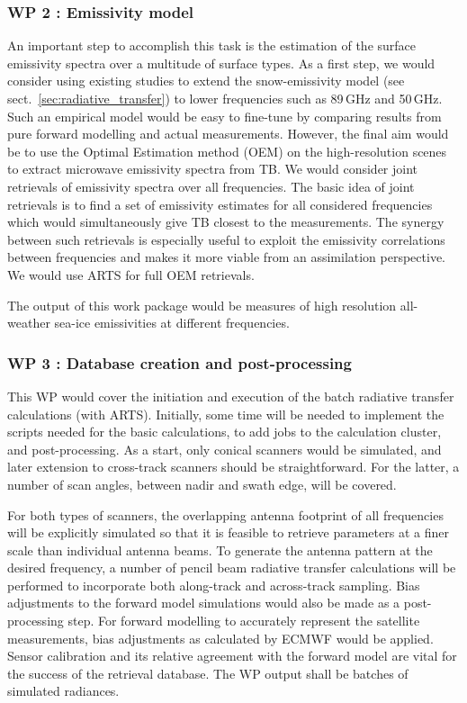 \documentclass[12pt,oneside,a4paper]{article}
\begin{document}
\subsubsection*{WP 2 : Emissivity model}
%
\label{sec:emissivity}
An important step to accomplish this task is the estimation of the surface emissivity spectra over a multitude of surface types. As a first step, we would consider using existing studies to extend the snow-emissivity model (see sect.~\ref{sec:radiative_transfer}) to lower frequencies such as 89\,GHz and 50\,GHz. Such an empirical model would be easy to fine-tune by comparing results from pure forward modelling and actual measurements. However, the final aim would be to use the Optimal Estimation method (OEM) on the high-resolution scenes to extract microwave emissivity spectra from TB. We would consider joint retrievals of emissivity spectra over all frequencies. The basic idea of joint retrievals is to find a set of emissivity estimates for all considered frequencies which would simultaneously give TB closest to the measurements. The synergy between such retrievals is especially useful to exploit the emissivity correlations between frequencies and makes it more viable from an assimilation perspective. We would use ARTS for full OEM retrievals.

The output of this work package would be measures of high resolution all-weather sea-ice emissivities at different frequencies. 
	
\subsubsection*{WP 3 : Database creation and post-processing}
%
\label{sec:database}	
This WP would cover the initiation and execution of the batch radiative transfer calculations (with ARTS). Initially, some time will be needed to implement the scripts needed for the basic calculations, to add jobs to the calculation cluster, and post-processing. As a start, only conical scanners would be simulated, and later extension to cross-track scanners should be straightforward. For the latter, a number of scan angles, between nadir and swath edge, will be covered.

For both types of scanners, the overlapping antenna footprint of all frequencies will be explicitly simulated so that it is feasible to retrieve parameters at a finer scale than individual antenna beams. To generate the antenna pattern at the desired frequency, a number of pencil beam radiative transfer calculations will be performed to incorporate both along-track and across-track sampling. Bias adjustments to the forward model simulations would also be made as a post-processing step. For forward modelling to accurately represent the satellite measurements, bias adjustments as calculated by ECMWF would be applied. Sensor calibration and its relative agreement with the forward model are vital for the success of the retrieval database. 
The WP output shall be batches of simulated radiances.
\end{document}
